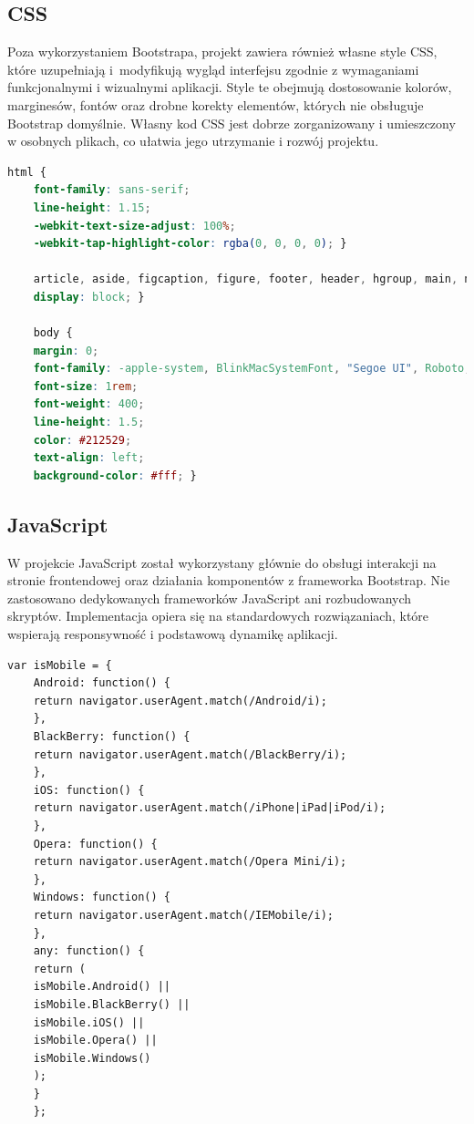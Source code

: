 \documentclass[12pt]{article}
\begin{document}
	\subsection{CSS}
	Poza wykorzystaniem Bootstrapa, projekt zawiera również własne style CSS, które uzupełniają i~modyfikują wygląd interfejsu zgodnie z wymaganiami funkcjonalnymi i wizualnymi aplikacji. Style te obejmują dostosowanie kolorów, marginesów, fontów oraz drobne korekty elementów, których nie obsługuje Bootstrap domyślnie. Własny kod CSS jest dobrze zorganizowany i umieszczony w osobnych plikach, co ułatwia jego utrzymanie i rozwój projektu.
	\begin{lstlisting}[language=CSS, caption={Fragment kodu CSS}]
	html {
	font-family: sans-serif;
	line-height: 1.15;
	-webkit-text-size-adjust: 100%;
	-webkit-tap-highlight-color: rgba(0, 0, 0, 0); }
	
	article, aside, figcaption, figure, footer, header, hgroup, main, nav, section {
	display: block; }
	
	body {
	margin: 0;
	font-family: -apple-system, BlinkMacSystemFont, "Segoe UI", Roboto, "Helvetica Neue", Arial, "Noto Sans", sans-serif, "Apple Color Emoji", "Segoe UI Emoji", "Segoe UI Symbol", "Noto Color Emoji";
	font-size: 1rem;
	font-weight: 400;
	line-height: 1.5;
	color: #212529;
	text-align: left;
	background-color: #fff; }
	\end{lstlisting}

    \newpage
	\subsection{JavaScript}
	W projekcie JavaScript został wykorzystany głównie do obsługi interakcji na stronie frontendowej oraz działania komponentów z frameworka Bootstrap. Nie zastosowano dedykowanych frameworków JavaScript ani rozbudowanych skryptów. Implementacja opiera się na standardowych rozwiązaniach, które wspierają responsywność i podstawową dynamikę aplikacji.
	\begin{lstlisting}[style=jsStyle, caption={Fragment kodu JavaScript}]
	var isMobile = {
	Android: function() {
	return navigator.userAgent.match(/Android/i);
	},
	BlackBerry: function() {
	return navigator.userAgent.match(/BlackBerry/i);
	},
	iOS: function() {
	return navigator.userAgent.match(/iPhone|iPad|iPod/i);
	},
	Opera: function() {
	return navigator.userAgent.match(/Opera Mini/i);
	},
	Windows: function() {
	return navigator.userAgent.match(/IEMobile/i);
	},
	any: function() {
	return (
	isMobile.Android() ||
	isMobile.BlackBerry() ||
	isMobile.iOS() ||
	isMobile.Opera() ||
	isMobile.Windows()
	);
	}
	};
	\end{lstlisting}
	
\end{document}
